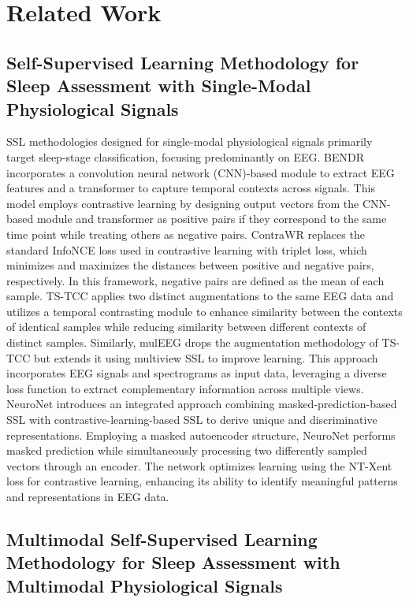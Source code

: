 \section{Related Work}
\subsection{Self-Supervised Learning Methodology for Sleep Assessment with Single-Modal Physiological Signals}

SSL methodologies designed for single-modal physiological signals primarily target sleep-stage classification, focusing predominantly on EEG. BENDR \cite{ref15} incorporates a convolution neural network (CNN)-based module to extract EEG features and a transformer to capture temporal contexts across signals. This model employs contrastive learning by designing output vectors from the CNN-based module and transformer as positive pairs if they correspond to the same time point while treating others as negative pairs. ContraWR \cite{ref16} replaces the standard InfoNCE loss used in contrastive learning with triplet loss, which minimizes and maximizes the distances between positive and negative pairs, respectively. In this framework, negative pairs are defined as the mean of each sample. TS-TCC \cite{ref17} applies two distinct augmentations to the same EEG data and utilizes a temporal contrasting module to enhance similarity between the contexts of identical samples while reducing similarity between different contexts of distinct samples. Similarly, mulEEG \cite{ref18} drops the augmentation methodology of TS-TCC \cite{ref17} but extends it using multiview SSL to improve learning. This approach incorporates EEG signals and spectrograms as input data, leveraging a diverse loss function to extract complementary information across multiple views. NeuroNet \cite{ref19} introduces an integrated approach combining masked-prediction-based SSL with contrastive-learning-based SSL to derive unique and discriminative representations. Employing a masked autoencoder structure, NeuroNet \cite{ref19} performs masked prediction while simultaneously processing two differently sampled vectors through an encoder. The network optimizes learning using the NT-Xent loss for contrastive learning, enhancing its ability to identify meaningful patterns and representations in EEG data.


\subsection{Multimodal Self-Supervised Learning Methodology for Sleep Assessment with Multimodal Physiological Signals}

